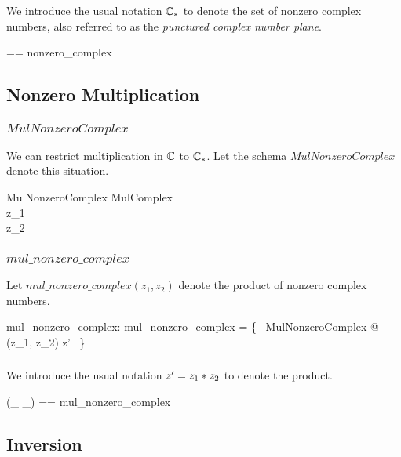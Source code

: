 \documentclass[11pt, oneside]{article}
\begin{document}
We introduce the usual notation $\mathbb{C}_{*}$ to denote the set of nonzero complex numbers,
also referred to as the \textit{punctured complex number plane}.

\begin{zed}
	\Cnz == nonzero\_complex
\end{zed}

\subsection{Nonzero Multiplication}

\subsubsection{$MulNonzeroComplex$}

We can restrict multiplication in $\mathbb{C}$ to $\mathbb{C}_{*}$.
Let the schema $MulNonzeroComplex$ denote this situation.

\begin{schema}{MulNonzeroComplex}
	MulComplex \\
\where
	z_1 \in \Cnz \\
	z_2 \in \Cnz
\end{schema}

\subsubsection{$mul\_nonzero\_complex$}

Let $mul\_nonzero\_complex(z_1, z_2)$ denote the product of nonzero complex numbers.

\begin{axdef}
	mul\_nonzero\_complex: \Cnz \cross \Cnz \fun \Cnz
\where
	mul\_nonzero\_complex = \{~ MulNonzeroComplex @ (z_1, z_2) \mapsto z' ~\}
\end{axdef}

\subsubsection{}

We introduce the usual notation $z' = z_1 \mathbin{*} z_2$ to denote the product.

\begin{zed}
	(\_ \mulCnz \_) == mul\_nonzero\_complex
\end{zed}

\subsection{Inversion}
\end{document}
